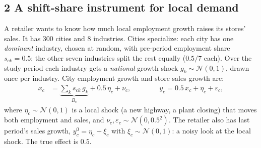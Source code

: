 \documentclass[11pt]{article}
\begin{document}
\subsection*{2 A shift-share instrument for local demand}

A retailer wants to know how much local employment growth raises its stores' sales. It has
$300$ cities and $8$ industries. Cities specialize: each city has one \emph{dominant} industry,
chosen at random, with pre-period employment share $s_{ck} = 0.5$; the other seven industries
split the rest equally ($0.5/7$ each). Over the study period each industry gets a
\emph{national} growth shock $g_{k} \sim \mathcal{N}(0, 1)$, drawn once per industry. City
employment growth and store sales growth are:
\begin{align*}
x_{c} &= \underbrace{\textstyle\sum_{k} s_{ck}\, g_{k}}_{B_{c}} + 0.5\, \eta_{c} + \nu_{c},
\qquad\qquad
y_{c} = 0.5\, x_{c} + \eta_{c} + \varepsilon_{c},
\end{align*}
where $\eta_{c} \sim \mathcal{N}(0,1)$ is a local shock (a new highway, a plant closing) that
moves both employment and sales, and $\nu_{c}, \varepsilon_{c} \sim \mathcal{N}(0, 0.5^{2})$.
The retailer also has last period's sales growth, $y^{0}_{c} = \eta_{c} + \xi_{c}$ with
$\xi_{c} \sim \mathcal{N}(0,1)$: a noisy look at the local shock. The true effect is $0.5$.
\end{document}
